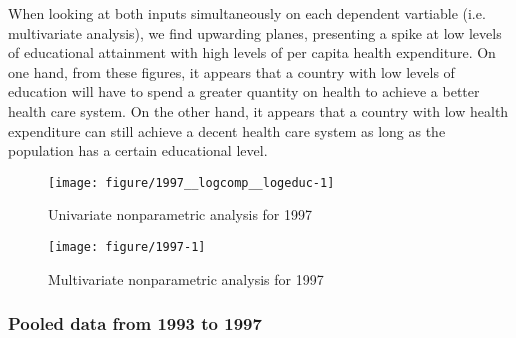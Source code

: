 \documentclass[12pt,a4paper]{article}\usepackage[]{graphicx}\usepackage[]{color}
\newenvironment{knitrout}{}{} %
\begin{document}
When looking at both inputs simultaneously on each dependent vartiable (i.e. multivariate analysis), we find upwarding planes, presenting a spike at low levels of educational attainment with high levels of per capita health expenditure. On one hand, from these figures, it appears that a country with low levels of education will have to spend a greater quantity on health to achieve a better health care system. On the other hand, it appears that a country with low health expenditure can still achieve a decent health care system as long as the population has a certain educational level.

\begin{knitrout}
\color{fgcolor}\begin{figure}[htbp]

{\centering \texttt{[image: figure/1997\_\_logcomp\_\_logeduc-1]} 

}

\caption[Univariate nonparametric analysis for 1997]{Univariate nonparametric analysis for 1997}\label{fig:1997, logcomp, logeduc}
\end{figure}


\end{knitrout}

\begin{knitrout}
\color{fgcolor}\begin{figure}[htbp]

{\centering \texttt{[image: figure/1997-1]} 

}

\caption[Multivariate nonparametric analysis for 1997]{Multivariate nonparametric analysis for 1997}\label{fig:1997}
\end{figure}


\end{knitrout}

\subsubsection{Pooled data from 1993 to 1997}
\end{document}
